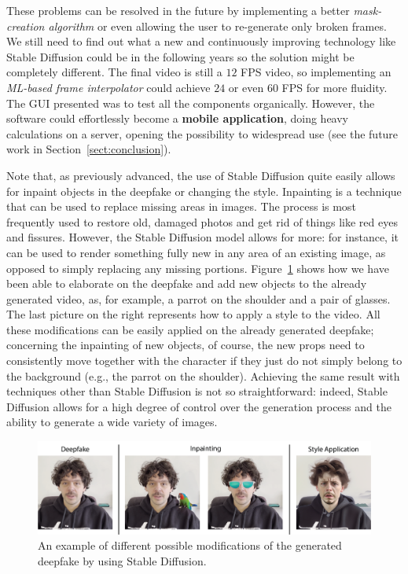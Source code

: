 \documentclass[preprint]{elsarticle}
\begin{document}
These problems can be resolved in the future by implementing a better \emph{mask-creation algorithm} or even allowing the user to re-generate only broken frames. We still need to find out what a new and continuously improving technology like Stable Diffusion could be in the following years so the solution might be completely different. The final video is still a $12$ FPS video, so implementing an \emph{ML-based frame interpolator} could achieve  $24$ or even $60$ FPS for more fluidity.  The GUI presented was to test all the components organically. However, the software could effortlessly become a \textbf{mobile application}, doing heavy calculations on a server, opening the possibility to widespread use (see the future work in Section~\ref{sect:conclusion}).

Note that, as previously advanced, the use of Stable Diffusion quite easily allows for inpaint objects in the deepfake or changing the style. Inpainting is a technique that can be used to replace missing areas in images. The process is most frequently used to restore old, damaged photos and get rid of things like red eyes and fissures. However, the Stable Diffusion model allows for more: for instance, it can be used to render something fully new in any area of an existing image, as opposed to simply replacing any missing portions. Figure~\ref{fig:options} shows how we have been able to elaborate on the deepfake and add new objects to the already generated video, as, for example, a parrot on the shoulder and a pair of glasses. The last picture on the right represents how to apply a style to the video. All these modifications can be easily applied on the already generated deepfake; concerning the inpainting of new objects, of course, the new props need to consistently move together with the character if they just do not simply belong to the background (e.g., the parrot on the shoulder). Achieving the same result with techniques other than Stable Diffusion is not so straightforward: indeed, Stable Diffusion allows for a high degree of control over the generation process and the ability to generate a wide variety of images.

\begin{figure}
	\centering
	\includegraphics[scale=0.8, keepaspectratio]{img/project_img/FinalDemo.png}
	\caption{An example of different possible modifications of the generated  deepfake by using Stable Diffusion.}\label{fig:options}
\end{figure}
\end{document}
